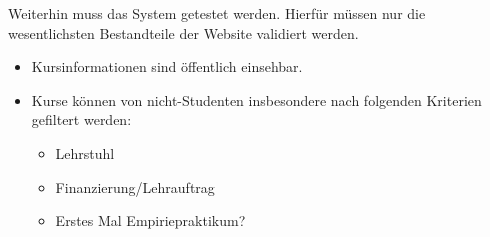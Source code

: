 		Weiterhin muss das System getestet werden.
		Hierfür müssen nur die wesentlichsten Bestandteile der Website validiert werden.
	
		\begin{itemize}
			\item Kursinformationen sind öffentlich einsehbar.
			\item Kurse können von nicht-Studenten insbesondere nach folgenden Kriterien gefiltert werden: 
			\begin{itemize}
				\item Lehrstuhl
				\item Finanzierung/Lehrauftrag
				\item Erstes Mal Empiriepraktikum?
			\end{itemize}
		\end{itemize}
